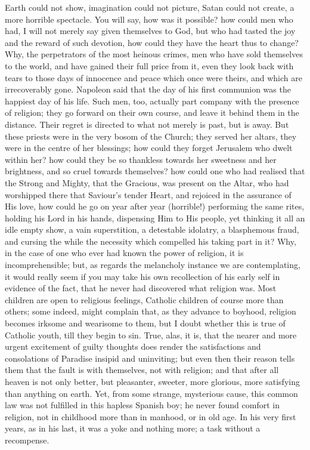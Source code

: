 Earth could not show, imagination could not picture,
Satan could not create, a more horrible spectacle. You
will say, how was it possible? how could men who had, I
will not merely say given themselves to God, but who had
tasted the joy and the reward of such devotion, how could
they have the heart thus to change? Why, the perpetrators
of the most heinous crimes, men who have sold themselves
to the world, and have gained their full price from it,
even they look back with tears to those days of innocence
and peace which once were theirs, and which are
irrecoverably gone. Napoleon said that the day of his
first communion was the happiest day of his life. Such
men, too, actually part company with the presence of
religion; they go forward on their own course, and leave
it behind them in the distance. Their regret is directed
to what not merely is past, but is away. But these
priests were in the very bosom of the Church; they served
her altars, they were in the centre of her blessings; how
could they forget Jerusalem who dwelt within her? how
could they be so thankless towards her sweetness and her
brightness, and so cruel towards themselves? how could
one who had realised that the Strong and Mighty, that the
Gracious, was present on the Altar, who had worshipped
there that Saviour's tender Heart, and rejoiced in the
assurance of His love, how could he go on year after year
(horrible!) performing the same rites, holding his Lord
in his hands, dispensing Him to His people, yet thinking
it all an idle empty show, a vain superstition, a
detestable idolatry, a blasphemous fraud, and cursing the
while the necessity which compelled his taking part in
it? Why, in the case of one who ever had known the power
of religion, it is incomprehensible; but, as regards the
melancholy instance we are contemplating, it would really
seem if you may take his own recollection of his early
self in evidence of the fact, that he never had
discovered what religion was. Most children are open to
religious feelings, Catholic children of course more than
others; some indeed, might complain that, as they advance
to boyhood, religion becomes irksome and wearisome to
them, but I doubt whether this is true of Catholic youth,
till they begin to sin. True, alas, it is, that the
nearer and more urgent excitement of guilty thoughts does
render the satisfactions and consolations of Paradise
insipid and uninviting; but even then their reason tells
them that the fault is with themselves, not with
religion; and that after all heaven is not only better,
but pleasanter, sweeter, more glorious, more satisfying
than anything on earth. Yet, from some strange,
mysterious cause, this common law was not fulfilled in
this hapless Spanish boy; he never found comfort in
religion, not in childhood more than in manhood, or in
old age. In his very first years, as in his last, it was
a yoke and nothing more; a task without a recompense.

